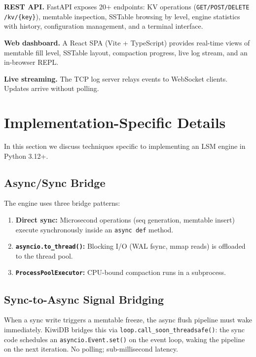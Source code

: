 \documentclass[conference]{IEEEtran}
\begin{document}
\textbf{REST API.} FastAPI exposes 20+ endpoints: KV operations (\texttt{GET/POST/DELETE /kv/\{key\}}), memtable inspection, SSTable browsing by level, engine statistics with history, configuration management, and a terminal interface.

\textbf{Web dashboard.} A React SPA (Vite + TypeScript) provides real-time views of memtable fill level, SSTable layout, compaction progress, live log stream, and an in-browser REPL.

\textbf{Live streaming.} The TCP log server relays events to WebSocket clients. Updates arrive without polling.

\section{Implementation-Specific Details}
\label{sec:impl-details}

In this section we discuss techniques specific to implementing an LSM engine in Python 3.12+.

\subsection{Async/Sync Bridge}

The engine uses three bridge patterns:

\begin{enumerate}[leftmargin=*]
    \item \textbf{Direct sync:} Microsecond operations (seq generation, memtable insert) execute synchronously inside an \texttt{async def} method.
    \item \textbf{\texttt{asyncio.to\_thread()}:} Blocking I/O (WAL fsync, mmap reads) is offloaded to the thread pool.
    \item \textbf{\texttt{ProcessPoolExecutor}:} CPU-bound compaction runs in a subprocess.
\end{enumerate}

\subsection{Sync-to-Async Signal Bridging}

When a sync write triggers a memtable freeze, the async flush pipeline must wake immediately. KiwiDB bridges this via \texttt{loop.call\_soon\_threadsafe()}: the sync code schedules an \texttt{asyncio.Event.set()} on the event loop, waking the pipeline on the next iteration. No polling; sub-millisecond latency.
\end{document}
